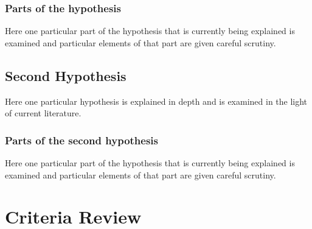 \subsubsection{Parts of the hypothesis}

Here one particular part of the hypothesis that is
currently being explained is examined and particular
elements of that part are given careful scrutiny.


\subsection{Second Hypothesis}

Here one particular hypothesis is explained in depth
and is examined in the light of current literature.

\subsubsection{Parts of the second hypothesis}

Here one particular part of the hypothesis that is
currently being explained is examined and particular
elements of that part are given careful scrutiny.

\section{Criteria Review}

